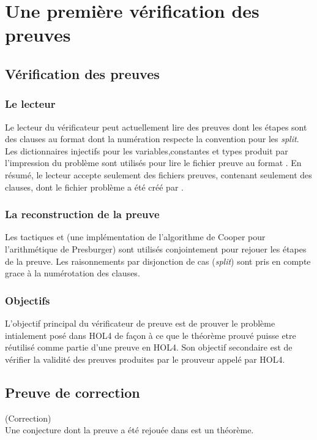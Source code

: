 \section{Une première vérification des preuves \tff}

\subsection{Vérification des preuves}

\subsubsection{Le lecteur}
Le lecteur du vérificateur peut actuellement lire des preuves dont les étapes sont des clauses au format \tff dont la numération respecte la convention \tff pour les \textit{split}. Les dictionnaires injectifs pour les variables,constantes et types produit par l'impression du problème sont utilisés pour lire le fichier preuve au format \tff. En résumé, le lecteur accepte seulement des fichiers preuves, contenant seulement des clauses, dont le fichier problème a été créé par \holfour.

\subsubsection{La reconstruction de la preuve}
Les tactiques \metistac et \coopertac (une implémentation de l'algorithme de Cooper pour l'arithmétique de Presburger)
sont utilisés conjointement pour rejouer les étapes de la preuve. 
Les raisonnements par disjonction de cas (\textit{split}) sont pris en compte grace à la numérotation des clauses.

\subsubsection{Objectifs}
L'objectif principal du vérificateur de preuve est de prouver le problème intialement posé dans HOL4 de façon à ce que le théorème prouvé puisse etre réutilisé comme partie d'une preuve en HOL4. Son objectif secondaire est de vérifier la validité des preuves produites par le prouveur appelé par HOL4.

\subsection{Preuve de correction}
\begin{thm}(Correction)
\\Une conjecture dont la preuve a été rejouée dans \holfour est un théorème.
\end{thm}

